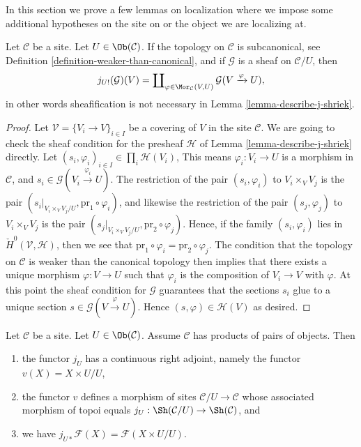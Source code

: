\noindent
In this section we prove a few lemmas on localization where we
impose some additional hypotheses on the site on or the object
we are localizing at.

\begin{lemma}
\label{lemma-describe-j-shriek-good-site}
Let $\mathcal{C}$ be a site.
Let $U \in \Ob(\mathcal{C})$.
If the topology on $\mathcal{C}$ is subcanonical, see
Definition \ref{definition-weaker-than-canonical},
and if $\mathcal{G}$ is a sheaf on $\mathcal{C}/U$, then
$$
j_{U!}(\mathcal{G})(V)
=
\coprod\nolimits_{\varphi \in \Mor_\mathcal{C}(V, U)}
\mathcal{G}(V \xrightarrow{\varphi} U),
$$
in other words sheafification is not necessary in
Lemma \ref{lemma-describe-j-shriek}.
\end{lemma}

\begin{proof}
Let $\mathcal{V} = \{V_i \to V\}_{i \in I}$ be a covering of $V$
in the site $\mathcal{C}$.
We are going to check the sheaf condition for the presheaf $\mathcal{H}$
of Lemma \ref{lemma-describe-j-shriek} directly.
Let $(s_i, \varphi_i)_{i \in I} \in \prod_i \mathcal{H}(V_i)$,
This means $\varphi_i : V_i \to U$ is a morphism in $\mathcal{C}$, and
$s_i \in \mathcal{G}(V_i \xrightarrow{\varphi_i} U)$.
The restriction of the pair $(s_i, \varphi_i)$ to
$V_i \times_V V_j$ is the pair
$(s_i|_{V_i \times_V V_j/U}, \text{pr}_1 \circ \varphi_i)$, and
likewise the restriction of the pair $(s_j, \varphi_j)$ to
$V_i \times_V V_j$ is the pair
$(s_j|_{V_i \times_V V_j/U}, \text{pr}_2 \circ \varphi_j)$.
Hence, if the family $(s_i, \varphi_i)$ lies in
$\check{H}^0(\mathcal{V}, \mathcal{H})$, then we see that
$\text{pr}_1 \circ \varphi_i = \text{pr}_2 \circ \varphi_j$.
The condition that the topology on $\mathcal{C}$ is weaker than the canonical
topology then implies that there exists a unique morphism
$\varphi : V \to U$ such that $\varphi_i$ is the composition
of $V_i \to V$ with $\varphi$. At this point the sheaf condition for
$\mathcal{G}$ guarantees that the sections $s_i$ glue to a unique
section $s \in \mathcal{G}(V \xrightarrow{\varphi} U)$.
Hence $(s, \varphi) \in \mathcal{H}(V)$ as desired.
\end{proof}

\begin{lemma}
\label{lemma-localize-given-products}
Let $\mathcal{C}$ be a site.
Let $U \in \Ob(\mathcal{C})$.
Assume $\mathcal{C}$ has products of pairs of objects.
Then
\begin{enumerate}
\item the functor $j_U$ has a continuous right adjoint,
namely the functor $v(X) = X \times U / U$,
\item the functor $v$ defines a morphism of sites
$\mathcal{C}/U \to \mathcal{C}$ whose associated morphism of topoi equals
$j_U : \Sh(\mathcal{C}/U) \to \Sh(\mathcal{C})$, and
\item we have $j_{U*}\mathcal{F}(X) = \mathcal{F}(X \times U/U)$.
\end{enumerate}
\end{lemma}

